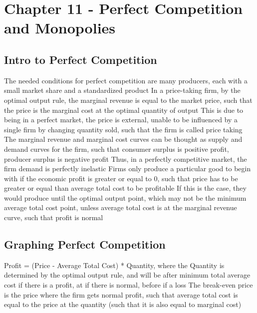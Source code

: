 \documentclass[11 pt, twoside]{article}
\newenvironment{outline*}
{
	\begin{outline}[enumerate]
	}
	{\end{outline}
}
\begin{document}
\section{Chapter 11 - Perfect Competition and Monopolies}
\subsection{Intro to Perfect Competition}
\begin{outline*}
\1 The needed conditions for perfect competition are many producers, each with a small market share and a standardized product
\1 In a price-taking firm, by the optimal output rule, the marginal revenue is equal to the market price, such that the price is the marginal cost at the optimal quantity of output
\2 This is due to being in a perfect market, the price is external, unable to be influenced by a single firm by changing quantity sold, such that the firm is called price taking
\1 The marginal revenue and marginal cost curves can be thought as supply and demand curves for the firm, such that consumer surplus is positive profit, producer surplus is negative profit
\2 Thus, in a perfectly competitive market, the firm demand is perfectly inelastic
\1 Firms only produce a particular good to begin with if the economic profit is greater or equal to 0, such that price has to be greater or equal than average total cost to be profitable
\2 If this is the case, they would produce until the optimal output point, which may not be the minimum average total cost point, unless average total cost is at the marginal revenue curve, such that profit is normal
\end{outline*}
\subsection{Graphing Perfect Competition}
\begin{outline*}
\1 Profit = (Price - Average Total Cost) * Quantity, where the Quantity is determined by the optimal output rule, and will be after minimum total average cost if there is a profit, at if there is normal, before if a loss
\2 The break-even price is the price where the firm gets normal profit, such that average total cost is equal to the price at the quantity (such that it is also equal to marginal cost)
\end{outline*}
\end{document}
